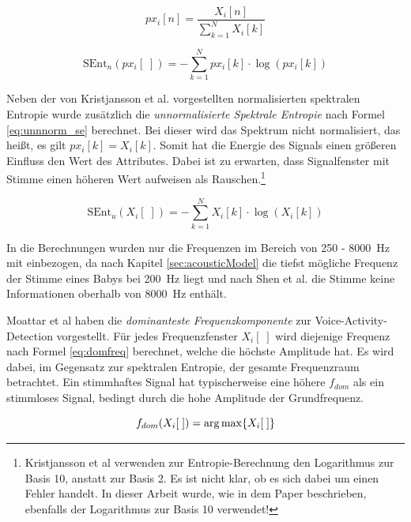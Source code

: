 \begin{equation}
px_i[n] = \frac{X_i[n]}{\sum_{k=1}^{N} X_i[k]}
\label{eq:norm_spek}
\end{equation}

\begin{equation}
\text{SEnt}_n(px_i[\;]) = -\sum_{k=1}^{N}px_i[k] \cdot\log(px_i[k])
\label{eq:norm_se}
\end{equation}

Neben der von Kristjansson et al. \cite{vad_Lisboa} vorgestellten normalisierten spektralen Entropie wurde zusätzlich die \emph{unnormalisierte Spektrale Entropie} nach Formel \ref{eq:unnnorm_se} berechnet. Bei dieser wird das Spektrum nicht normalisiert, das heißt, es gilt $px_i[k] = X_i[k]$. Somit hat die Energie des Signals einen größeren Einfluss den Wert des Attributes. Dabei ist zu erwarten, dass Signalfenster mit Stimme einen höheren Wert aufweisen als Rauschen.\footnote{Kristjansson et al \cite[S. 2]{vad_Lisboa} verwenden zur Entropie-Berechnung den Logarithmus zur Basis 10, anstatt zur Basis 2. Es ist nicht klar, ob es sich dabei um einen Fehler handelt. In dieser Arbeit wurde, wie in dem Paper beschrieben, ebenfalls der Logarithmus zur Basis 10 verwendet!}

\begin{equation}
\text{SEnt}_u(X_i[\;]) = -\sum_{k=1}^{N}X_i[k] \cdot\log(X_i[k])
\label{eq:unnnorm_se}
\end{equation}

In die Berechnungen wurden nur die Frequenzen im Bereich von 250 - \SI{8000}{\hertz} mit einbezogen, da nach Kapitel \ref{sec:acousticModel} die tiefst mögliche Frequenz der Stimme eines Babys bei \SI{200}{\hertz} liegt und nach Shen et al. \cite{vad_entropie02} die Stimme keine Informationen oberhalb von \SI{8000}{\hertz} enthält.

Moattar et al \cite[S. 2550]{vad_Easy} haben die \emph{dominanteste Frequenzkomponente} zur Voice-Activity-Detection vorgestellt. Für jedes Frequenzfenster $X_i[\;]$ wird diejenige Frequenz nach Formel \ref{eq:domfreq} berechnet, welche die höchste Amplitude hat. Es wird dabei, im Gegensatz zur spektralen Entropie, der gesamte Frequenzraum betrachtet. Ein stimmhaftes Signal hat typischerweise eine höhere $f_{dom}$ als ein stimmloses Signal, bedingt durch die hohe Amplitude der Grundfrequenz.

\begin{equation}
f_{dom}(X_i[\;]) = \operatorname*{arg\,max} \{X_i[\;]\}
\label{eq:domfreq}
\end{equation}


